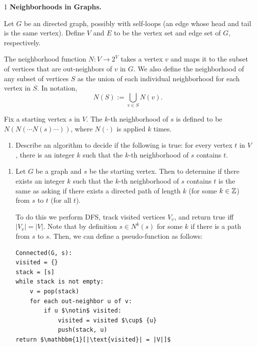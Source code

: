 \documentclass[12pt]{article}
\begin{document}


\begin{problem}{1}
    \textbf{Neighborhoods in Graphs.} 
    
    Let $G$ be an directed graph, possibly with self-loops (an edge whose head and tail is the same vertex). Define $V$ and $E$ to be the vertex set and edge set of $G$, respectively.

    The neighborhood function $N : V \to 2^V$ takes a vertex $v$ and maps it to the subset of vertices that are out-neighbors of $v$ in $G$. We also define the neighborhood of any subset of vertices $S$ as the union of each individual neighborhood for each vertex in $S$. In notation,
    \[
    N(S) := \bigcup_{v \in S} N(v).
    \]

    Fix a starting vertex $s$ in $V$. The $k$-th neighborhood of $s$ is defined to be $N(N(\cdots N(s)\cdots))$, where $N(\cdot)$ is applied $k$ times.

    \begin{enumerate}
    \item[(a)] Describe an algorithm to decide if the following is true: for every vertex $t$ in $V$, there is an integer $k$ such that the $k$-th neighborhood of $s$ contains $t$.
    \end{enumerate}
\end{problem}

\begin{solution}
    \bbni 
    \begin{enumerate}
        \item [(a)] Let $G$ be a graph and $s$ be the starting vertex. Then to determine if there exists an integer $k$ such that the $k$-th neighborhood of $s$ contains $t$ is the same as asking if there exists a directed path of length $k$ (for some $k \in \mathbb Z$) from $s$ to $t$ (for all $t$).
        
        To do this we perform DFS, track visited vertices $V_v$, and return true iff $|V_v| = |V|$. Note that by definition $s \in N^k(s)$ for some $k$ if there is a path from $s$ to $s$. Then, we can define a pseudo-function as follows: 
\vspace{.05in}

        \begin{lstlisting}[mathescape]
Connected(G, s):
visited = {}
stack = [s]
while stack is not empty:
    v = pop(stack)
    for each out-neighbor u of v:
        if u $\notin$ visited:
            visited = visited $\cup$ {u}
            push(stack, u)
return $\mathbbm{1}[|\text{visited}| = |V|]$
        \end{lstlisting}
        
    \end{enumerate}
\end{solution}
\end{document}
